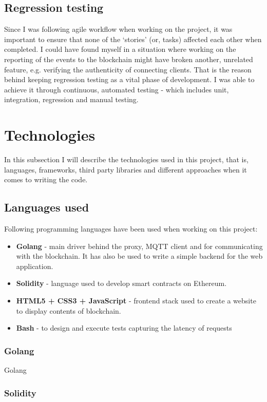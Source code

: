 \subsection{Regression testing}

Since I was following agile workflow when working on the project, it was important to ensure that none of the `stories' (or, tasks) affected each other when completed. I could have found myself in a situation where working on the reporting of the events to the blockchain might have broken another, unrelated feature, e.g. verifying the authenticity of connecting clients. That is the reason behind keeping regression testing as a vital phase of development. I was able to achieve it through continuous, automated testing - which includes unit, integration, regression and manual testing.

\section{Technologies}

In this subsection I will describe the technologies used in this project, that is, languages, frameworks, third party libraries and different approaches when it comes to writing the code.

\subsection{Languages used}

Following programming languages have been used when working on this project:
\begin{itemize}
 \item \textbf{Golang} - main driver behind the proxy, MQTT client and for communicating with the blockchain. It has also be used to write a simple backend for the web application.
 \item \textbf{Solidity} - language used to develop smart contracts on Ethereum.
 \item \textbf{HTML5 + CSS3 + JavaScript} - frontend stack used to create a website to display contents of blockchain.
 \item \textbf{Bash} - to design and execute tests capturing the latency of requests
\end{itemize}

\subsubsection{Golang}
Golang 
\subsubsection{Solidity}
